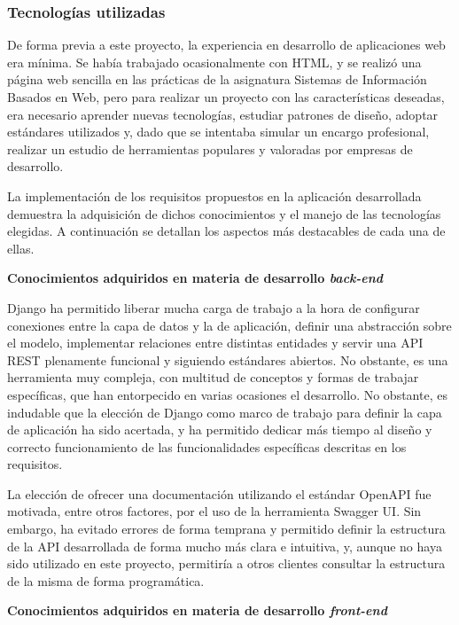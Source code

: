 \documentclass[10pt, a4paper]{aqademic}
\begin{document}
\subsubsection{Tecnologías utilizadas}

De forma previa a este proyecto, la experiencia en desarrollo de aplicaciones web era mínima. Se había trabajado ocasionalmente con HTML, y se realizó una página web sencilla en las prácticas de la asignatura Sistemas de Información Basados en Web, pero para realizar un proyecto con las características deseadas, era necesario aprender nuevas tecnologías, estudiar patrones de diseño, adoptar estándares utilizados y, dado que se intentaba simular un encargo profesional, realizar un estudio de herramientas populares y valoradas por empresas de desarrollo. 

La implementación de los requisitos propuestos en la aplicación desarrollada demuestra la adquisición de dichos conocimientos y el manejo de las tecnologías elegidas. A continuación se detallan los aspectos más destacables de cada una de ellas.

\textbf{Conocimientos adquiridos en materia de desarrollo \textit{back-end}}

Django ha permitido liberar mucha carga de trabajo a la hora de configurar conexiones entre la capa de datos y la de aplicación, definir una abstracción sobre el modelo, implementar relaciones entre distintas entidades y servir una API REST plenamente funcional y siguiendo estándares abiertos. No obstante, es una herramienta muy compleja, con multitud de conceptos y formas de trabajar específicas, que han entorpecido en varias ocasiones el desarrollo. No obstante, es indudable que la elección de Django como marco de trabajo para definir la capa de aplicación ha sido acertada, y ha permitido dedicar más tiempo al diseño y correcto funcionamiento de las funcionalidades específicas descritas en los requisitos.

La elección de ofrecer una documentación utilizando el estándar OpenAPI fue motivada, entre otros factores, por el uso de la herramienta Swagger UI. Sin embargo, ha evitado errores de forma temprana y permitido definir la estructura de la API desarrollada de forma mucho más clara e intuitiva, y, aunque no haya sido utilizado en este proyecto, permitiría a otros clientes consultar la estructura de la misma de forma programática.

\bigskip

\textbf{Conocimientos adquiridos en materia de desarrollo \textit{front-end}}
\end{document}
